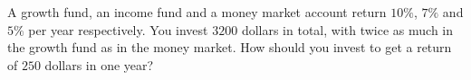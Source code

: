 A growth fund, an income fund and a money market account return $10\%$, $7\%$ and $5\%$ per year respectively. You invest $3200$ dollars in total, with twice as much in the growth fund as in the money market. How should you invest to get a return of $250$ dollars in one year?
